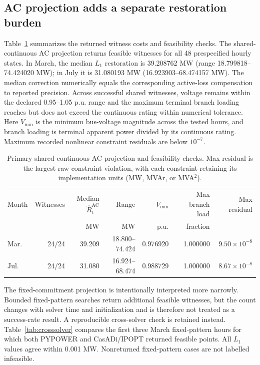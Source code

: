 \documentclass[journal]{IEEEtran}
\begin{document}
\subsection{AC projection adds a separate restoration burden}
Table~\ref{tab:ac} summarizes the returned witness costs and feasibility checks.
The shared-continuous AC projection returns feasible witnesses for all 48 prespecified hourly states. In March, the median $L_1$ restoration is 39.208762 MW (range 18.799818--74.424020 MW); in July it is 31.080193 MW (16.923903--68.474157 MW). The median correction numerically equals the corresponding active-loss compensation to reported precision. Across successful shared witnesses, voltage remains within the declared 0.95--1.05 p.u. range and the maximum terminal branch loading reaches but does not exceed the continuous rating within numerical tolerance. Here $V_{\min}$ is the minimum bus-voltage magnitude across the tested hours, and branch loading is terminal apparent power divided by its continuous rating. Maximum recorded nonlinear constraint residuals are below $10^{-7}$.

\begin{table}[t]
\caption{Primary shared-continuous AC projection and feasibility checks. Max residual is the largest raw constraint violation, with each constraint retaining its implementation units (MW, MVAr, or MVA$^2$).}
\label{tab:ac}
\centering
\footnotesize
\setlength{\tabcolsep}{5pt}
\begin{tabular}{lrrrrrr}
\toprule
Month & Witnesses & Median $\widehat R_t^{\mathrm{AC}}$ & Range & $V_{\min}$ & Max branch load & Max residual\\
 & & MW & MW & p.u. & fraction & \\
\midrule
Mar. & 24/24 & 39.209 & 18.800--74.424 & 0.976920 & 1.000000 & $9.50\!\times\!10^{-8}$\\
Jul. & 24/24 & 31.080 & 16.924--68.474 & 0.988729 & 1.000000 & $8.67\!\times\!10^{-8}$\\
\bottomrule
\end{tabular}
\end{table}

The fixed-commitment projection is intentionally interpreted more narrowly. Bounded fixed-pattern searches return additional feasible witnesses, but the count changes with solver time and initialization and is therefore not treated as a success-rate result. A reproducible cross-solver check is retained instead. Table~\ref{tab:crosssolver} compares the first three March fixed-pattern hours for which both PYPOWER and CasADi/IPOPT returned feasible points. All $L_1$ values agree within 0.001 MW. Nonreturned fixed-pattern cases are not labelled infeasible.
\end{document}
